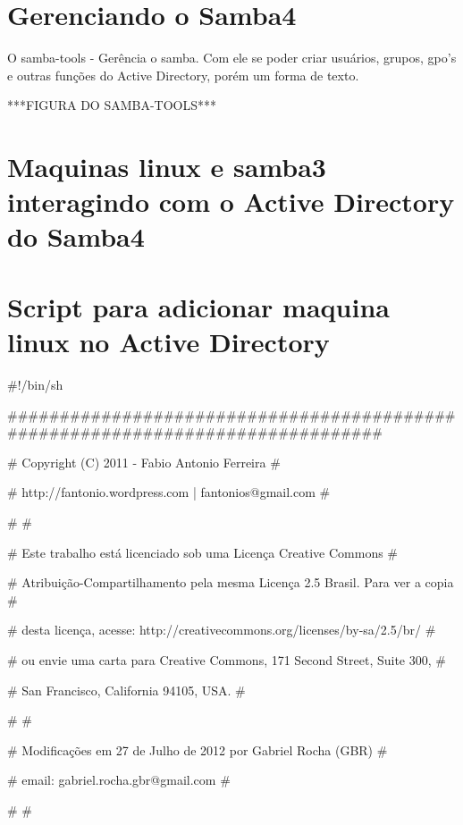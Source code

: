 \section{Gerenciando o Samba4}

O samba-tools - Gerência o samba. Com ele se poder criar usuários, grupos, gpo's e outras funções do Active Directory, porém um forma de texto.

***FIGURA DO SAMBA-TOOLS***

\section{Maquinas linux e samba3 interagindo com o Active Directory do  Samba4}

\section{Script para adicionar maquina linux no Active Directory}

#!/bin/sh

 
###############################################################################

# Copyright (C) 2011 - Fabio Antonio Ferreira                                 #

# http://fantonio.wordpress.com | fantonios@gmail.com                         #

#                                                                             #

# Este trabalho está licenciado sob uma Licença Creative Commons              #

# Atribuição-Compartilhamento pela mesma Licença 2.5 Brasil. Para ver a copia #

# desta licença, acesse: http://creativecommons.org/licenses/by-sa/2.5/br/    #

# ou envie uma carta para Creative Commons, 171 Second Street, Suite 300,     #

# San Francisco, California 94105, USA.                                       #

#                                                                             #

# Modificações em 27 de Julho de 2012 por Gabriel Rocha (GBR)                 #

# email: gabriel.rocha.gbr@gmail.com                                          #

#                                                                             #

